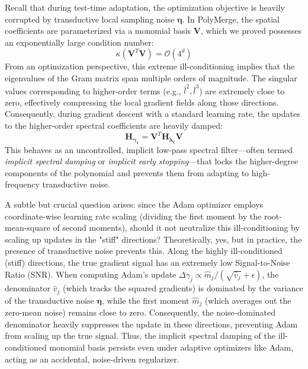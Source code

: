 Recall that during test-time adaptation, the optimization objective is heavily corrupted by transductive local sampling noise $\boldsymbol{\eta}$. In PolyMerge, the spatial coefficients are parameterized via a monomial basis $\mathbf{V}$, which we proved possesses an exponentially large condition number:
\begin{equation}
\kappa(\mathbf{V}^T \mathbf{V}) = \mathcal{O}(4^d)
\end{equation}
From an optimization perspective, this extreme ill-conditioning implies that the eigenvalues of the Gram matrix span multiple orders of magnitude. The singular values corresponding to higher-order terms (e.g., $\bar{l}^2, \bar{l}^3$) are extremely close to zero, effectively compressing the local gradient fields along those directions. Consequently, during gradient descent with a standard learning rate, the updates to the higher-order spectral coefficients are heavily damped:
\begin{equation}
\mathbf{H}_{\boldsymbol{\gamma}_k} = \mathbf{V}^T \mathbf{H}_{\boldsymbol{\lambda}_k} \mathbf{V}
\end{equation}
This behaves as an uncontrolled, implicit low-pass spectral filter---often termed \emph{implicit spectral damping} or \emph{implicit early stopping}---that locks the higher-degree components of the polynomial and prevents them from adapting to high-frequency transductive noise.

A subtle but crucial question arises: since the Adam optimizer employs coordinate-wise learning rate scaling (dividing the first moment by the root-mean-square of second moments), should it not neutralize this ill-conditioning by scaling up updates in the "stiff" directions? Theoretically, yes, but in practice, the presence of transductive noise prevents this. Along the highly ill-conditioned (stiff) directions, the true gradient signal has an extremely low Signal-to-Noise Ratio (SNR). When computing Adam's update $\Delta \gamma_j \propto \hat{m}_j / (\sqrt{\hat{v}_j} + \epsilon)$, the denominator $\hat{v}_j$ (which tracks the squared gradients) is dominated by the variance of the transductive noise $\boldsymbol{\eta}$, while the first moment $\hat{m}_j$ (which averages out the zero-mean noise) remains close to zero. Consequently, the noise-dominated denominator heavily suppresses the update in these directions, preventing Adam from scaling up the true signal. Thus, the implicit spectral damping of the ill-conditioned monomial basis persists even under adaptive optimizers like Adam, acting as an accidental, noise-driven regularizer.

